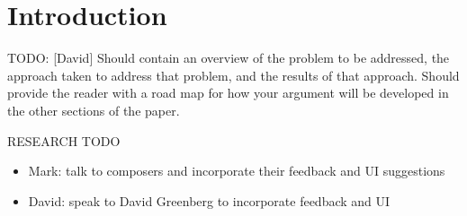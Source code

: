 \documentclass[final,authoryear,11pt,times]{elsarticle}
\begin{document}

\section{Introduction}
\label{sec:introduction}
TODO: [David]  Should contain an overview of the problem to be addressed, the approach taken to   
  address that problem, and the results of that approach. Should provide the reader with a  
  road map for how your argument will be developed in the other sections of the paper.


RESEARCH TODO
\begin{itemize}
\item Mark: talk to composers and incorporate their feedback and UI suggestions
\item David: speak to David Greenberg to incorporate feedback and UI
\end{itemize}

%
%




\end{document}
